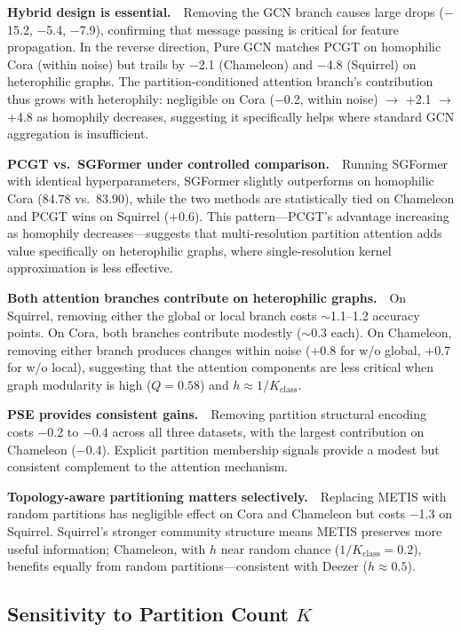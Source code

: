 \textbf{Hybrid design is essential.}~~Removing the GCN branch causes large drops ($-$15.2, $-$5.4, $-$7.9), confirming that message passing is critical for feature propagation. In the reverse direction, Pure GCN matches PCGT on homophilic Cora (within noise) but trails by $-$2.1 (Chameleon) and $-$4.8 (Squirrel) on heterophilic graphs. The partition-conditioned attention branch's contribution thus grows with heterophily: negligible on Cora ($-$0.2, within noise) $\to$ +2.1 $\to$ +4.8 as homophily decreases, suggesting it specifically helps where standard GCN aggregation is insufficient.

\textbf{PCGT vs.\ SGFormer under controlled comparison.}~~Running SGFormer with identical hyperparameters, SGFormer slightly outperforms on homophilic Cora ($84.78$ vs.\ $83.90$), while the two methods are statistically tied on Chameleon and PCGT wins on Squirrel ($+$0.6). This pattern---PCGT's advantage increasing as homophily decreases---suggests that multi-resolution partition attention adds value specifically on heterophilic graphs, where single-resolution kernel approximation is less effective.

\textbf{Both attention branches contribute on heterophilic graphs.}~~On Squirrel, removing either the global or local branch costs $\sim$1.1--1.2 accuracy points. On Cora, both branches contribute modestly ($\sim$0.3 each). On Chameleon, removing either branch produces changes within noise ($+$0.8 for w/o global, $+$0.7 for w/o local), suggesting that the attention components are less critical when graph modularity is high ($Q = 0.58$) and $h \approx 1/K_{\text{class}}$.

\textbf{PSE provides consistent gains.}~~Removing partition structural encoding costs $-$0.2 to $-$0.4 across all three datasets, with the largest contribution on Chameleon ($-$0.4). Explicit partition membership signals provide a modest but consistent complement to the attention mechanism.

\textbf{Topology-aware partitioning matters selectively.}~~Replacing METIS with random partitions has negligible effect on Cora and Chameleon but costs $-$1.3 on Squirrel. Squirrel's stronger community structure means METIS preserves more useful information; Chameleon, with $h$ near random chance ($1/K_{\text{class}} = 0.2$), benefits equally from random partitions---consistent with Deezer ($h \approx 0.5$).

\subsection{Sensitivity to Partition Count \texorpdfstring{$K$}{K}}


